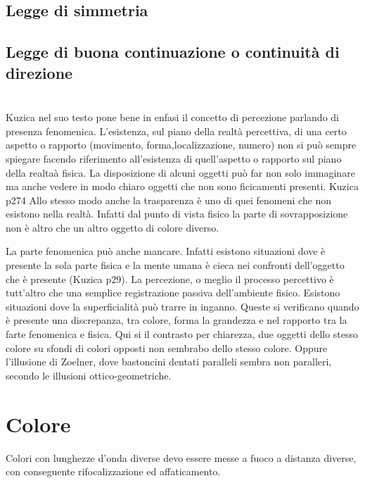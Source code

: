 \documentclass{ium}
\begin{document}
\subsection{Legge di simmetria}
\subsection{Legge di buona continuazione o continuità di direzione}


\section{}

Kuzica nel suo testo pone bene in enfasi il concetto di percezione parlando di presenza fenomenica. 
L'esistenza, sul piano della realtà percettiva, di una certo aspetto o rapporto (movimento, forma,localizzazione, numero) non si può sempre spiegare facendo riferimento all'esistenza di quell'aspetto o rapporto sul piano della realtaà fisica.
La disposizione di alcuni oggetti può far non solo immaginare ma anche vedere in modo chiaro oggetti che non sono ficicamenti presenti. Kuzica p274
Allo stesso modo anche la trasparenza è uno di quei fenomeni che non esistono nella realtà. Infatti dal punto di vista fisico la parte di sovrapposizione non è altro che un altro oggetto di colore diverso.

La parte fenomenica può anche mancare. Infatti esistono situazioni dove è presente la sola parte fisica e la mente umana è cieca nei confronti dell'oggetto che è presente (Kuzica p29).  
La percezione, o meglio il processo percettivo è tutt'altro che una semplice registrazione passiva dell'ambiente fisico. Esistono situazioni dove la superficialità può trarre in inganno. Queste si verificano quando è presente una discrepanza, tra colore, forma la grandezza e nel rapporto tra la farte fenomenica e fisica. Qui si il contrasto per chiarezza, due oggetti dello stesso colore su sfondi di colori opposti non sembrabo dello stesso colore. Oppure l'illusione di Zoelner, dove bastoncini dentati paralleli sembra non paralleri, secondo le illusioni ottico-geometriche.

\section{Colore}

Colori con lunghezze d'onda diverse devo essere messe a fuoco a distanza diverse, con conseguente rifocalizzazione ed affaticamento.
\end{document}
